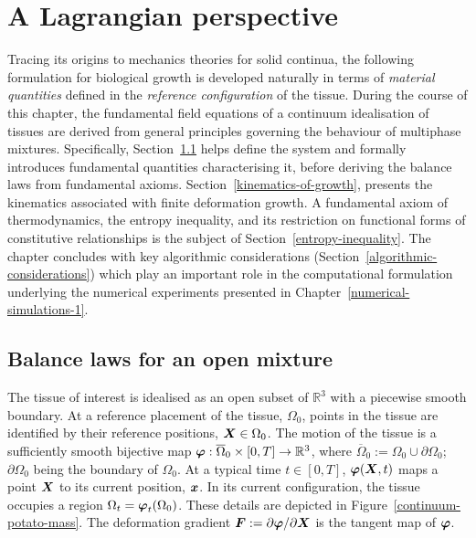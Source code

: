\chapter{A Lagrangian perspective}
\label{lagrangian-perspective}

Tracing its origins to mechanics theories for solid continua, the
following formulation for biological growth is developed naturally in
terms of {\em material quantities} defined in the {\em reference
  configuration} of the tissue. During the course of this chapter, the
fundamental field equations of a continuum idealisation of tissues are
derived from general principles governing the behaviour of multiphase
mixtures. Specifically, Section~\ref{balance-laws} helps define the
system and formally introduces fundamental quantities characterising
it, before deriving the balance laws from fundamental
axioms. Section~\ref{kinematics-of-growth}, presents the kinematics
associated with finite deformation growth. A fundamental axiom of
thermodynamics, the entropy inequality, and its restriction on
functional forms of constitutive relationships is the subject of
Section~\ref{entropy-inequality}. The chapter concludes with key
algorithmic considerations (Section~\ref{algorithmic-considerations})
which play an important role in the computational formulation
underlying the numerical experiments presented in
Chapter~\ref{numerical-simulations-1}.

\section{Balance laws for an open mixture}
\label{balance-laws}

The tissue of interest is idealised as an open subset of
$\mathbb{R}^3$ with a piecewise smooth boundary. At a reference
placement of the tissue, $\Omega_0$, points in the tissue are
identified by their reference positions, $\mbox{\boldmath$ X$} \in \Omega_0$. The
motion of the tissue is a sufficiently smooth bijective map $\mbox{\boldmath$\varphi$}:
\overline{\Omega}_0 \times [0,T] \rightarrow \mathbb{R}^3$, where
$\overline{\Omega}_0 := \Omega_0 \cup \partial\Omega_0$;
$\partial\Omega_0$ being the boundary of $\Omega_0$. At a typical time
$t \in [0,T]$, $\mbox{\boldmath$\varphi$}(\mbox{\boldmath$ X$},t)$ maps a point $\mbox{\boldmath$ X$}$ to its current
position, $\mbox{\boldmath$ x$}$. In its current configuration, the tissue occupies a
region $\Omega_t = \mbox{\boldmath$\varphi$}_t (\Omega_0)$. These details are depicted
in Figure~\ref{continuum-potato-mass}. The deformation gradient $\mbox{\boldmath$ F$}
:= \partial \mbox{\boldmath$\varphi$}/ \partial\mbox{\boldmath$ X$}$ is the tangent map of $\mbox{\boldmath$\varphi$}$.

